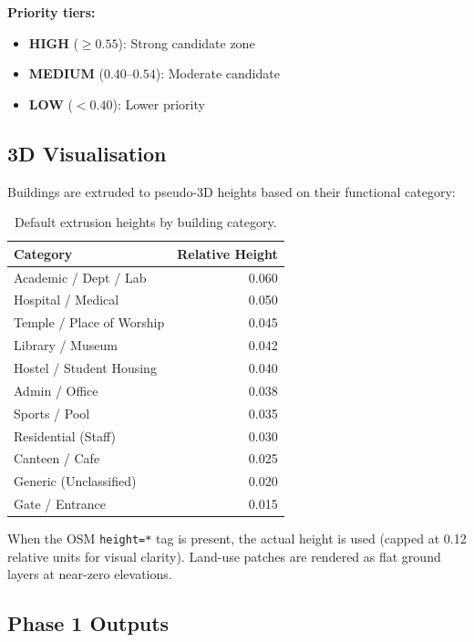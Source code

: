 \documentclass[12pt, a4paper]{article}
\begin{document}
\textbf{Priority tiers:}
\begin{itemize}
    \item \textcolor{green!70!black}{\textbf{HIGH}} ($\geq 0.55$): 
    Strong candidate zone
    \item \textcolor{orange!80!black}{\textbf{MEDIUM}} ($0.40$--$0.54$): 
    Moderate candidate
    \item \textcolor{red!70!black}{\textbf{LOW}} ($< 0.40$): Lower 
    priority
\end{itemize}

\subsection{3D Visualisation}

Buildings are extruded to pseudo-3D heights based on their functional 
category:

\begin{table}[H]
\centering
\caption{Default extrusion heights by building category.}
\label{tab:3d_heights}
\begin{tabular}{@{}lr@{}}
\toprule
\textbf{Category} & \textbf{Relative Height} \\
\midrule
Academic / Dept / Lab & 0.060 \\
Hospital / Medical & 0.050 \\
Temple / Place of Worship & 0.045 \\
Library / Museum & 0.042 \\
Hostel / Student Housing & 0.040 \\
Admin / Office & 0.038 \\
Sports / Pool & 0.035 \\
Residential (Staff) & 0.030 \\
Canteen / Cafe & 0.025 \\
Generic (Unclassified) & 0.020 \\
Gate / Entrance & 0.015 \\
\bottomrule
\end{tabular}
\end{table}

When the OSM \texttt{height=*} tag is present, the actual height is 
used (capped at 0.12 relative units for visual clarity). Land-use 
patches are rendered as flat ground layers at near-zero elevations.

\subsection{Phase 1 Outputs}
\end{document}
